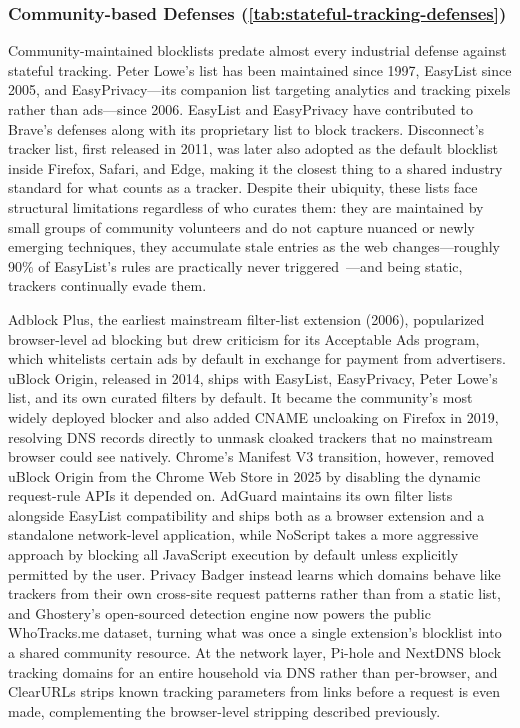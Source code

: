 \subsubsection{Community-based Defenses (\autoref{tab:stateful-tracking-defenses})}
\label{sec:stateful-defenses-community}



%
Community-maintained blocklists predate almost every industrial defense against stateful tracking. 
%
Peter Lowe's list has been maintained since 1997, EasyList since 2005, and EasyPrivacy---its companion list targeting analytics and tracking pixels rather than ads---since 2006. 
%
EasyList and EasyPrivacy have contributed to Brave's defenses along with its proprietary list to block trackers.
%
Disconnect's tracker list, first released in 2011, was later also adopted as the default blocklist inside Firefox, Safari, and Edge, making it the closest thing to a shared industry standard for what counts as a tracker.
%
Despite their ubiquity, these lists face structural limitations regardless of who curates them: they are maintained by small groups of community volunteers and do not capture nuanced or newly emerging techniques, they accumulate stale entries as the web changes---roughly 90\% of EasyList's rules are practically never triggered~\cite{snyderWhoFiltersFilters2020}---and being static, trackers continually evade them.


%
Adblock Plus, the earliest mainstream filter-list extension (2006), popularized browser-level ad blocking but drew criticism for its Acceptable Ads program, which whitelists certain ads by default in exchange for payment from advertisers.
%
uBlock Origin, released in 2014, ships with EasyList, EasyPrivacy, Peter Lowe's list, and its own curated filters by default. 
%
It became the community's most widely deployed blocker and also added CNAME uncloaking on Firefox in 2019, resolving DNS records directly to unmask cloaked trackers that no mainstream browser could see natively.
%
Chrome's Manifest V3 transition, however, removed uBlock Origin from the Chrome Web Store in 2025 by disabling the dynamic request-rule APIs it depended on.
%
AdGuard maintains its own filter lists alongside EasyList compatibility and ships both as a browser extension and a standalone network-level application, while NoScript takes a more aggressive approach by blocking all JavaScript execution by default unless explicitly permitted by the user.
%
Privacy Badger instead learns which domains behave like trackers from their own cross-site request patterns rather than from a static list, and Ghostery's open-sourced detection engine now powers the public WhoTracks.me dataset, turning what was once a single extension's blocklist into a shared community resource.
%
At the network layer, Pi-hole and NextDNS block tracking domains for an entire household via DNS rather than per-browser, and ClearURLs strips known tracking parameters from links before a request is even made, complementing the browser-level stripping described previously.


